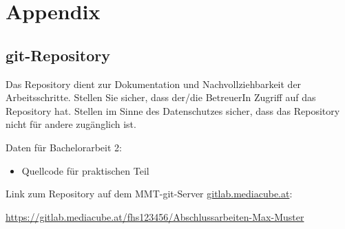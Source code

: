 \appendix


\section*{Appendix}
\renewcommand{\thesubsection}{\Alph{subsection}}

\subsection{git-Repository}

Das Repository dient zur Dokumentation und Nachvollziehbarkeit der Arbeitsschritte. Stellen Sie sicher, dass der/die BetreuerIn Zugriff auf das Repository hat. Stellen im Sinne des Datenschutzes sicher, dass das Repository nicht für andere zugänglich ist.


Daten für Bachelorarbeit 2:
\begin{itemize}
	\item Quellcode für praktischen Teil
\end{itemize}

Link zum Repository auf dem MMT-git-Server {\url{gitlab.mediacube.at}}:

{\color{red}\url{https://gitlab.mediacube.at/fhs123456/Abschlussarbeiten-Max-Muster}}
